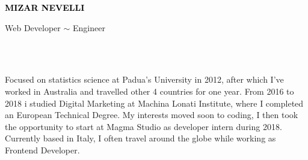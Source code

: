 \documentclass[9pt]{developercv} %
\begin{document}

\begin{minipage}[t]{0.35\textwidth} 
	\vspace{-\baselineskip} %
	
	{ \fontsize{16}{20} \textcolor{black}{\textbf{\MakeUppercase{Mizar Nevelli}}}} %
	
	\vspace{6pt}
	
	{\Large Web Developer $\sim$ Engineer} %
\end{minipage}
\hfill
\begin{minipage}[t]{0.27\textwidth} %
	\vspace{-\baselineskip} %
	
	 
    \\
    \
	
\end{minipage}
\begin{minipage}[t]{0.27\textwidth} %
	\vspace{-\baselineskip} %
	
    
\end{minipage}



\begin{minipage}[t]{1\textwidth}
	\vspace{-6pt}
 
    Focused on statistics science at Padua's University in 2012, after which I've worked in Australia and  travelled other 4 countries for one year. From 2016 to 2018 i studied Digital Marketing at Machina Lonati Institute, where I completed an European Technical Degree.
    My interests moved soon to coding, I then took the opportunity to start at Magma Studio as developer intern during 2018. 
    Currently based in Italy, I often travel around the globe while working as Frontend Developer.
    
\end{minipage}
\end{document}
